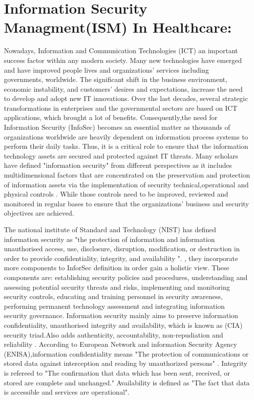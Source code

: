 \section{Information Security Managment(ISM) In Healthcare:}
Nowadays, Information and Communication Technologies (ICT) an important success factor within any modern society. Many new technologies have emerged and have improved people lives and organizations’ services including governments, worldwide. The significant shift in the business environment, economic instability, and customers’ desires and expectations, increase the need to develop and adopt new IT innovations. Over the last decades, several strategic transformations in enterprises and the governmental sectors are based on ICT applications, which brought a lot of benefits. Consequently,the need for Information Security (InfoSec) becomes an essential matter as thousands of organizations worldwide are heavily dependent on information process systems to perform their daily tasks. Thus, it is a critical role to ensure that the information technology assets are secured and protected against IT threats.
Many scholars have defined "information security" from different perspectives as it includes multidimensional factors that are concentrated on the preservation and protection of information assets via the implementation of security technical,operational and physical controls \cite{Hamid2014,Posthumus2004}. While those controls  need to be improved, reviewed and monitored in regular bases to ensure that the organizations' business and security objectives are achieved\cite{ISO/IEC2014}. 


The national institute of Standard and Technology (NIST)\cite{Kissel2013} has defined information security as "the protection of information and information unauthorised access, use, disclosure, disruption, modification, or destruction in order to provide confidentiality, integrity, and availability ". \citet{Zafar2009}, they incorporate more components to InforSec definition in order gain a holistic view. These components are: establishing security policies and procedures, understanding and assessing potential security threats and risks, implementing and monitoring security controls, educating and training personnel in security awareness, performing permanent technology assessment and integrating information security governance. Information security mainly aims to preserve information confidentiality, unauthorised integrity and availability, which is known as (CIA) security triad\cite{pfleeger2007security}.Also \cite{ISO/IEC2014} adds authenticity, accountability, non-repudiation and reliability . According to European Network and information Security Agency (ENISA)\cite{ENISA2006},information confidentiality means "The protection of communications or stored data against interception and reading by unauthorized persons" . Integrity is refereed to "The confirmation that data which has been sent, received, or stored are complete and unchanged." Availability is defined as "The fact that data is accessible and services are operational". 


